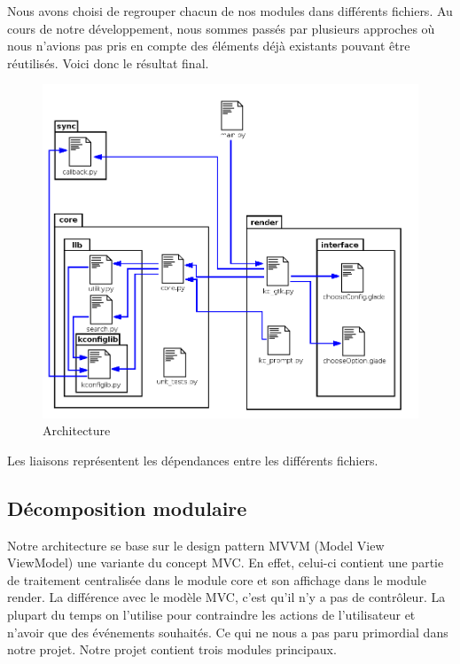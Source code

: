 \documentclass[16pts]{report}
\begin{document}
Nous avons choisi de regrouper chacun de nos modules dans différents fichiers.
Au cours de notre développement, nous sommes passés par plusieurs approches
où nous n'avions pas pris en compte des éléments déjà existants pouvant être
réutilisés. Voici donc le résultat final.
\begin{figure}[H]
    \includegraphics[scale=0.5]{illustrations/archi_add_v1.png}
    \centering
    \caption{Architecture}
    \label{fig:Arch}
\end{figure}

Les liaisons représentent les dépendances entre les différents fichiers.

\subsection{Décomposition modulaire}
\label{sec:Décomposition modulaire}
Notre architecture se base sur le design pattern MVVM (Model View
ViewModel) une variante du concept MVC. En effet, celui-ci contient une
partie de traitement centralisée dans le module core et son affichage dans
le module render.
La différence avec le modèle MVC, c'est qu'il n'y a pas de contrôleur.  La
plupart du temps on l'utilise pour contraindre les actions de l'utilisateur
et n'avoir que des événements souhaités. Ce qui ne nous a pas paru primordial
dans notre projet.
Notre projet contient trois modules principaux.
\end{document}

